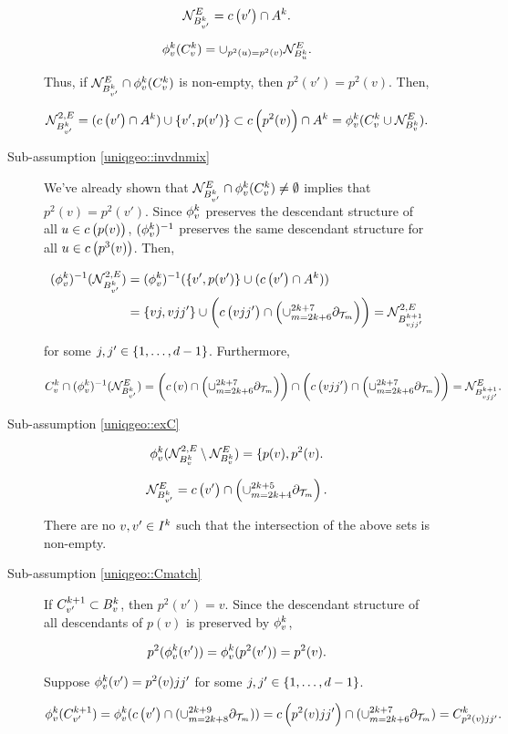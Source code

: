 \begin{description}
\begin{description}
\[\mathcal{N}^E_{B^{k}_{v'}} = c\left(v'\right)\cap A^{k}.\]

\[\phi^{k}_v(C^{k}_v) = \cup_{p^2(u) = p^2(v)} \mathcal{N}^E_{B^{k}_u}.\]

Thus, if \(\mathcal{N}^E_{B^{k}_{v'}}\cap \phi^{k}_v(C^{k}_v)\) is non-empty, then \(p^2(v') = p^2(v)\). Then,

\[\mathcal{N}^{2,E}_{B^{k}_{v'}} = (c\left(v'\right)\cap A^{k})\cup\{v',p(v')\} \subset c\left(p^2(v)\right)\cap A^{k} = \phi^{k}_v(C^{k}_v\cup\mathcal{N}^E_{B^{k}_v}).\]

\item[Sub-assumption \ref{uniqgeo::invdnmix}] We've already shown that \(\mathcal{N}^E_{B^{k}_{v'}}\cap \phi^{k}_v(C^{k}_v) \neq \emptyset\) implies that \(p^2(v) = p^2(v')\). Since \(\phi^{k}_v\) preserves the descendant structure of all \(u\in c\left(p(v)\right)\), \((\phi^{k}_v)^{-1}\) preserves the same descendant structure for all \(u \in c\left(p^3(v)\right)\). Then,

\begin{align*}
(\phi^{k}_v)^{-1}(\mathcal{N}^{2,E}_{B^{k}_{v'}}) &= (\phi^{k}_v)^{-1}(\{v',p(v')\}\cup(c\left(v'\right)\cap A^{k}))\\
& = \{vj,vjj'\}\cup\left(c\left(vjj'\right)\cap\left(\cup_{m=2k+6}^{2k+7}\partial_{\mathcal{T}_{m}}\right)\right) = \mathcal{N}^{2,E}_{B^{k+1}_{vjj'}}
\end{align*}


for some \(j,j' \in \{1,\dots,d-1\}\). Furthermore,

\[C^{k}_v \cap (\phi^{k}_v)^{-1}(\mathcal{N}^E_{B^{k}_{v'}}) = \left(c\left(v\right)\cap\left(\cup_{m=2k+6}^{2k+7}\partial_{\mathcal{T}_{m}}\right)\right)\cap \left(c\left(vjj'\right)\cap\left(\cup_{m=2k+6}^{2k+7}\partial_{\mathcal{T}_{m}}\right)\right) = \mathcal{N}^E_{B^{k+1}_{vjj'}}.\]

\item[Sub-assumption \ref{uniqgeo::exC}] 

\[\phi^{k}_v(\mathcal{N}^{2,E}_{B^{k}_v}\setminus\mathcal{N}^E_{B^{k}_v}) = \{p(v),p^2(v).\]

\[\mathcal{N}^E_{B^{k}_{v'}} = c\left(v'\right)\cap\left(\cup_{m=2k+4}^{2k+5}\partial_{\mathcal{T}_{m}}\right).\]

There are no \(v,v'\in I^{k}\) such that the intersection of the above sets is non-empty.

\item[Sub-assumption \ref{uniqgeo::Cmatch}] If \(C^{k+1}_{v'} \subset B^{k}_v\), then \(p^2(v') = v\). Since the descendant structure of all descendants of \(p(v)\) is preserved by \(\phi^{k}_v\), 

\[p^2(\phi^{k}_v(v')) = \phi^{k}_v(p^2(v')) = p^2(v).\]

Suppose \(\phi^{k}_v(v') = p^2(v)jj'\) for some \(j,j'\in\{1,\dots,d-1\}\).

\[\phi^{k}_v(C^{k+1}_{v'}) = \phi^{k}_v(c\left(v'\right)\cap(\cup_{m=2k+8}^{2k+9}\partial_{\mathcal{T}_{m}})) = c\left(p^2(v)jj'\right)\cap (\cup_{m=2k+6}^{2k+7} \partial_{\mathcal{T}_{m}}) = C^{k}_{p^2(v)jj'}.\]
\end{description}
\end{description}

